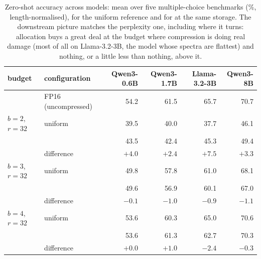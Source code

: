 \begin{table}[H]
\centering
\footnotesize
\setlength{\tabcolsep}{3pt}
\caption{Zero-shot accuracy across models: mean over five multiple-choice benchmarks (\%, length-normalised), for the uniform reference and for \method{} at the same storage. The downstream picture matches the perplexity one, including where it turns: allocation buys a great deal at the budget where compression is doing real damage (most of all on Llama-3.2-3B, the model whose spectra are flattest) and nothing, or a little less than nothing, above it.}
\label{tab:zeroshotmodels}
\begin{tabular}{llrrrr}
\toprule
budget & configuration & Qwen3-0.6B & Qwen3-1.7B & Llama-3.2-3B & Qwen3-8B \\
\midrule
& FP16 (uncompressed) & 54.2 & 61.5 & 65.7 & 70.7 \\
\midrule
$b=2$, $r=32$ & uniform & 39.5 & 40.0 & 37.7 & 46.1 \\
& \method{} & 43.5 & 42.4 & 45.3 & 49.4 \\
& difference & $\mathbf{+4.0}$ & $\mathbf{+2.4}$ & $\mathbf{+7.5}$ & $\mathbf{+3.3}$ \\
\midrule
$b=3$, $r=32$ & uniform & 49.8 & 57.8 & 61.0 & 68.1 \\
& \method{} & 49.6 & 56.9 & 60.1 & 67.0 \\
& difference & $-0.1$ & $-1.0$ & $-0.9$ & $-1.1$ \\
\midrule
$b=4$, $r=32$ & uniform & 53.6 & 60.3 & 65.0 & 70.6 \\
& \method{} & 53.6 & 61.3 & 62.7 & 70.3 \\
& difference & $+0.0$ & $\mathbf{+1.0}$ & $-2.4$ & $-0.3$ \\
\bottomrule
\end{tabular}
\end{table}
